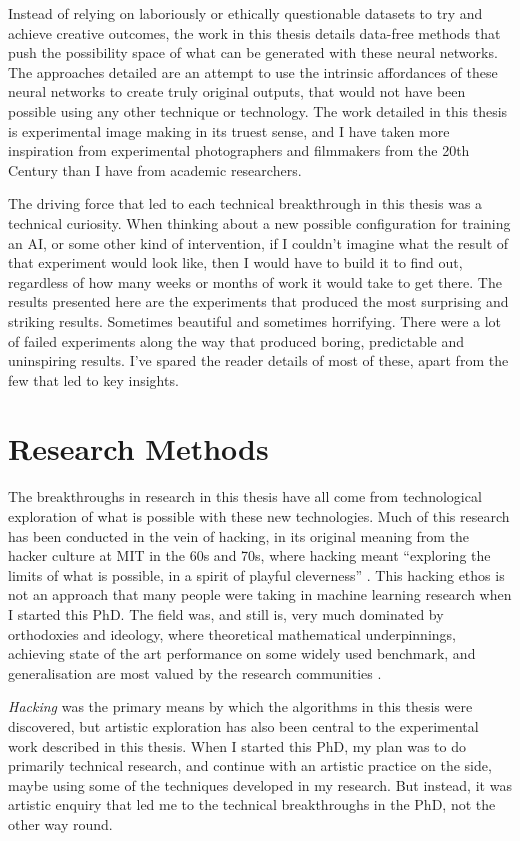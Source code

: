 Instead of relying on laboriously or ethically questionable datasets to try and achieve creative outcomes, the work in this thesis details data-free methods that push the possibility space of what can be generated with these neural networks. 
The approaches detailed are an attempt to use the intrinsic affordances of these neural networks to create truly original outputs, that would not have been possible using any other technique or technology. 
The work detailed in this thesis is experimental image making in its truest sense, and I have taken more inspiration from experimental photographers and filmmakers from the 20th Century than I have from academic researchers.

The driving force that led to each technical breakthrough in this thesis was a technical curiosity. 
When thinking about a new possible configuration for training an AI, or some other kind of intervention, if I couldn’t imagine what the result of that experiment would look like, then I would have to build it to find out, regardless of how many weeks or months of work it would take to get there. 
The results presented here are the experiments that produced the most surprising and striking results. 
Sometimes beautiful and sometimes horrifying. 
There were a lot of failed experiments along the way that produced boring, predictable and uninspiring results. 
I’ve spared the reader details of most of these, apart from the few that led to key insights.

\section{Research Methods}


The breakthroughs in research in this thesis have all come from technological exploration of what is possible with these new technologies. Much of this research has been conducted in the vein of hacking, in its original meaning from the hacker culture at MIT in the 60s and 70s, where hacking meant “exploring the limits of what is possible, in a spirit of playful cleverness” \citep{stallman2002hacking}. 
This hacking ethos is not an approach that many people were taking in machine learning research when I started this PhD. 
The field was, and still is, very much dominated by orthodoxies and ideology, where theoretical mathematical underpinnings, achieving state of the art performance on some widely used benchmark, and generalisation are most valued by the research communities \citep{birhane2022values}.

\textit{Hacking} was the primary means by which the algorithms in this thesis were discovered, but artistic exploration has also been central to the experimental work described in this thesis. 
When I started this PhD, my plan was to do primarily technical research, and continue with an artistic practice on the side, maybe using some of the techniques developed in my research. 
But instead, it was artistic enquiry that led me to the technical breakthroughs in the PhD, not the other way round. 

